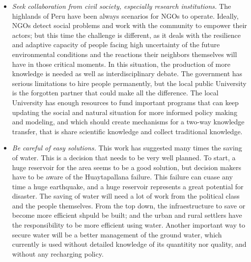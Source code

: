 \documentclass{article}
\begin{document}
\begin{itemize}
\item \emph{Seek collaboration from civil society, especially research institutions.} The highlands of Peru have been always scenarios for NGOs to operate. Ideally, NGOs detect social problems and work with the community to empower their actors; but this time the challenge is different, as it deals with the resilience and adaptive capacity of people facing high uncertainty of the future environmental conditions and the reactions their neighbors themselves will have in those critical moments. In this situation, the production of more knowledge is needed as well as interdisciplinary debate. The government has serious limitations to hire people permanently, but the local public University is the forgotten partner that could make all the difference. The local University has enough resources to fund important programs that can keep updating the social and natural situation for more informed policy making and modeling, and which should create mechanisms for a two-way knowledge transfer, that is share scientific knowledge and collect traditional knowledge. 
\item \emph{Be careful of easy solutions.} This work has suggested many times the saving of water. This is a decision that needs to be very well planned. To start, a huge reservoir for the area seems to be a good solution, but decision makers have to be aware of the Huaytapallana failure. This failure can cuase any time a huge earthquake, and a huge reservoir represents a great potential for disaster. The saving of water will need a lot of work from the political class and the people themselves. From the top down, the infraestructure to save or become more efficient shpuld be built; and the urban and rural settlers have the responsibility to be more efficient using water. Another important way to secure water will be a better management of the ground water, which currently is used without detailed knowledge of its quantitity nor quality, and without any recharging policy.

\end{itemize}





\printbibliography
\end{document}
